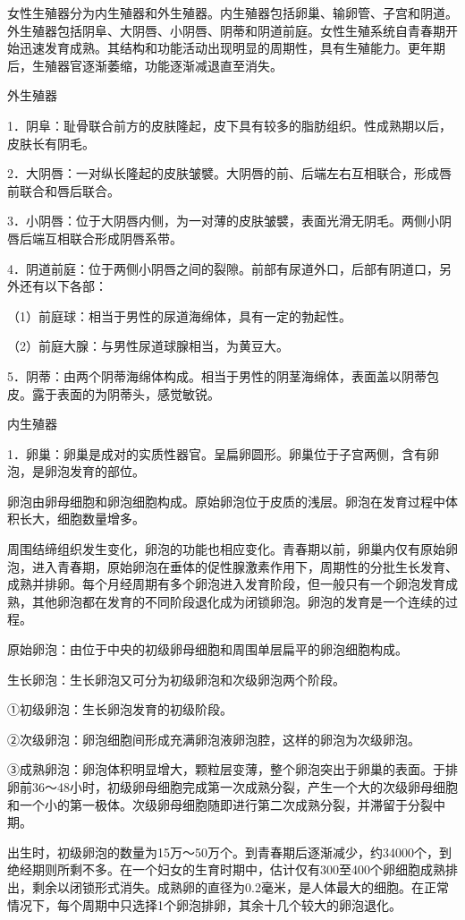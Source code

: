 \documentclass[12pt,UTF8,openany]{ctexbook}
\begin{document}
女性生殖器分为内生殖器和外生殖器。内生殖器包括卵巢、输卵管、子宫和阴道。外生殖器包括阴阜、大阴唇、小阴唇、阴蒂和阴道前庭。女性生殖系统自青春期开始迅速发育成熟。其结构和功能活动出现明显的周期性，具有生殖能力。更年期后，生殖器官逐渐萎缩，功能逐渐减退直至消失。

外生殖器

1．阴阜：耻骨联合前方的皮肤隆起，皮下具有较多的脂肪组织。性成熟期以后，皮肤长有阴毛。

2．大阴唇：一对纵长隆起的皮肤皱襞。大阴唇的前、后端左右互相联合，形成唇前联合和唇后联合。

3．小阴唇：位于大阴唇内侧，为一对薄的皮肤皱襞，表面光滑无阴毛。两侧小阴唇后端互相联合形成阴唇系带。

4．阴道前庭：位于两侧小阴唇之间的裂隙。前部有尿道外口，后部有阴道口，另外还有以下各部：

（1）前庭球：相当于男性的尿道海绵体，具有一定的勃起性。

（2）前庭大腺：与男性尿道球腺相当，为黄豆大。

5．阴蒂：由两个阴蒂海绵体构成。相当于男性的阴茎海绵体，表面盖以阴蒂包皮。露于表面的为阴蒂头，感觉敏锐。

内生殖器

1．卵巢：卵巢是成对的实质性器官。呈扁卵圆形。卵巢位于子宫两侧，含有卵泡，是卵泡发育的部位。

卵泡由卵母细胞和卵泡细胞构成。原始卵泡位于皮质的浅层。卵泡在发育过程中体积长大，细胞数量增多。

周围结缔组织发生变化，卵泡的功能也相应变化。青春期以前，卵巢内仅有原始卵泡，进入青春期，原始卵泡在垂体的促性腺激素作用下，周期性的分批生长发育、成熟并排卵。每个月经周期有多个卵泡进入发育阶段，但一般只有一个卵泡发育成熟，其他卵泡都在发育的不同阶段退化成为闭锁卵泡。卵泡的发育是一个连续的过程。

原始卵泡：由位于中央的初级卵母细胞和周围单层扁平的卵泡细胞构成。

生长卵泡：生长卵泡又可分为初级卵泡和次级卵泡两个阶段。

①初级卵泡：生长卵泡发育的初级阶段。

②次级卵泡：卵泡细胞间形成充满卵泡液卵泡腔，这样的卵泡为次级卵泡。

③成熟卵泡：卵泡体积明显增大，颗粒层变薄，整个卵泡突出于卵巢的表面。于排卵前36～48小时，初级卵母细胞完成第一次成熟分裂，产生一个大的次级卵母细胞和一个小的第一极体。次级卵母细胞随即进行第二次成熟分裂，并滞留于分裂中期。

出生时，初级卵泡的数量为15万～50万个。到青春期后逐渐减少，约34000个，到绝经期则所剩不多。在一个妇女的生育时期中，估计仅有300至400个卵细胞成熟排出，剩余以闭锁形式消失。成熟卵的直径为0.2毫米，是人体最大的细胞。在正常情况下，每个周期中只选择1个卵泡排卵，其余十几个较大的卵泡退化。
\end{document}
